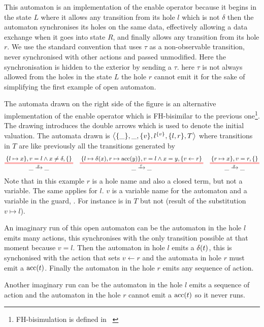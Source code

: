 \documentclass{article}
\begin{document}
\begin{exi}
This automaton is an implementation of the enable operator because it begins in the state \(L\) where it allows any transition from its hole \(l\) which is not \(\delta\) then the automaton synchronises its holes on the same data, effectively allowing a data exchange when it goes into state \(R\), and finally allows any transition from its hole \(r\).
We use the standard convention that uses $\tau$ as a non-observable transition, never synchronised with other actions and passed unmodified.
Here the synchronisation is hidden to the exterior by sending a \(\tau\).
 here \(\tau\) is not always allowed from the holes in the state \(L\) the hole \(r\) cannot emit it for the sake of simplifying the first example of open automaton.
\end{exi}
\begin{exi}
The automata drawn on the right side of the figure is an alternative implementation of the enable operator which is FH-bisimilar to the previous one\footnote{FH-bisimulation is defined in ~\cite{addcitation}}.
The drawing introduces the double arrows which is used to denote the initial valuation.
The automata drawn is \(\left<{\left\{\_\right\}},\_,{\left\{v\right\}},l^{\left\{v\right\}},{\left\{l, r\right\}},T\right>\) where transitions in \(T\) are like previously all the transitions generated by
\begin{align*}
	\OT{\_}{\_}{x}{\mbrc{l \mapsto x}}{v = l \wedge x \neq \delta}{\mbrc{}} &&
	\OT{\_}{\_}{\tau}{\mbrc{l \mapsto \delta\mpar{x}, r \mapsto \act{acc}\mpar{y}}}{v = l \wedge x = y}{\mbrc{v \gets r}} &&
	\OT{\_}{\_}{x}{\mbrc{r \mapsto x}}{v = r}{\mbrc{}}
\end{align*}
Note that in this example \(r\) is a hole name and also a closed term, but not a variable.
The same applies for \(l\).
\(v\) is a variable name for the automaton and a variable in the guard, .
For instance  is in \(T\) but not  (result of the substitution \(v \mapsto l\)).

An imaginary run of this open automaton can be the automaton in the hole \(l\) emits many actions, this synchronises with the only transition possible at that moment because \(v = l\).
Then the automaton in hole \(l\) emits a \(\delta{\left(t\right)}\), this is synchonised with the action that sets \(v \gets r\) and the automata in hole \(r\) must emit a \(\mathrm{acc}{\left(t\right)}\).
Finally the automaton in the hole \(r\) emits any sequence of action.

Another imaginary run can be the automaton in the hole \(l\) emits a sequence of action and the automaton in the hole \(r\) cannot emit a \(\mathrm{acc}{\left(t\right)}\) so it never runs.
\end{exi}
\end{document}
